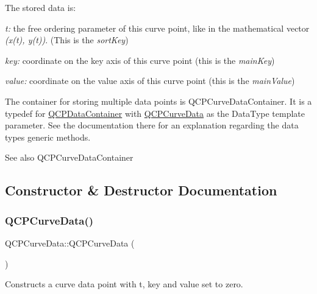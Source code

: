 The stored data is\+: \begin{DoxyItemize}
\item {\itshape t\+:} the free ordering parameter of this curve point, like in the mathematical vector {\itshape (x(t), y(t))}. (This is the {\itshape sort\+Key}) \item {\itshape key\+:} coordinate on the key axis of this curve point (this is the {\itshape main\+Key}) \item {\itshape value\+:} coordinate on the value axis of this curve point (this is the {\itshape main\+Value})\end{DoxyItemize}
The container for storing multiple data points is Q\+C\+P\+Curve\+Data\+Container. It is a typedef for \hyperlink{class_q_c_p_data_container}{Q\+C\+P\+Data\+Container} with \hyperlink{class_q_c_p_curve_data}{Q\+C\+P\+Curve\+Data} as the Data\+Type template parameter. See the documentation there for an explanation regarding the data type\textquotesingle{}s generic methods.

\begin{DoxySeeAlso}{See also}
Q\+C\+P\+Curve\+Data\+Container 
\end{DoxySeeAlso}


\subsection{Constructor \& Destructor Documentation}
\mbox{\label{class_q_c_p_curve_data_a48252779b5198a509d99c69ae223fbf8}} 
\subsubsection{\texorpdfstring{Q\+C\+P\+Curve\+Data()}{QCPCurveData()}\hspace{0.1cm}{\footnotesize\ttfamily [1/2]}}
{\footnotesize\ttfamily Q\+C\+P\+Curve\+Data\+::\+Q\+C\+P\+Curve\+Data (\begin{DoxyParamCaption}{ }\end{DoxyParamCaption})}

Constructs a curve data point with t, key and value set to zero. \mbox{\label{class_q_c_p_curve_data_a3586be0cc6f8db15bcdd0c0d03b0c173}} 
